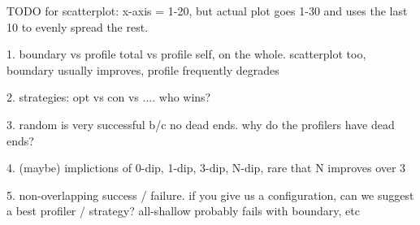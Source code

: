 
TODO for scatterplot: x-axis = 1-20, but actual plot goes 1-30 and uses the
last 10 to evenly spread the rest.

1. boundary vs profile total vs profile self, on the whole. scatterplot too,
   boundary usually improves, profile frequently degrades

2. strategies: opt vs con vs .... who wins?

3. random is very successful b/c no dead ends.
   why do the profilers have dead ends?

4. (maybe) implictions of 0-dip, 1-dip, 3-dip, N-dip,
   rare that N improves over 3

5. non-overlapping success / failure.
   if you give us a configuration, can we suggest a best profiler / strategy?
   all-shallow probably fails with boundary, etc

